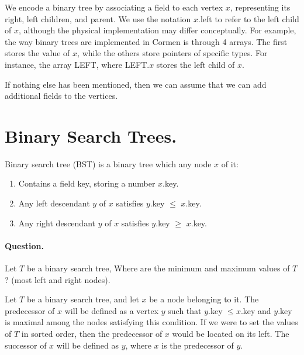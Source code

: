 We encode a binary tree by associating a field to each vertex $x$, representing its right, left children, and parent. We use the notation $x$.left to refer to the left child of $x$, although the physical implementation may differ conceptually. For example, the way binary trees are implemented in Cormen is through 4 arrays. The first stores the value of $x$, while the others store pointers of specific types. For instance, the array LEFT, where LEFT.$x$ stores the left child of $x$.


If nothing else has been mentioned, then we can assume that we can add additional fields to the vertices.



\section{Binary Search Trees.} Binary search tree (BST) is a binary tree which any node $x$ of it: 
\begin{enumerate}
  \item Contains a field key, storing a number $x$.key. 
  \item Any left descendant $y$ of $x$ satisfies $y$.key $\le$ $x$.key. 
  \item Any right descendant $y$ of $x$ satisfies $y$.key $\ge$ $x$.key. 
\end{enumerate}

\paragraph{Question.} Let $T$ be a binary search tree, Where are the minimum and maximum values of $T$? (most left and right nodes). 

\begin{definition}
Let $T$ be a binary search tree, and let $x$ be a node belonging to it. The predecessor of $x$ will be defined as a vertex $y$ such that $y$.key $\leq x$.key and $y$.key is maximal among the nodes satisfying this condition. If we were to set the values of $T$ in sorted order, then the predecessor of $x$ would be located on its left. The successor of $x$ will be defined as $y$, where $x$ is the predecessor of $y$.
\end{definition}

